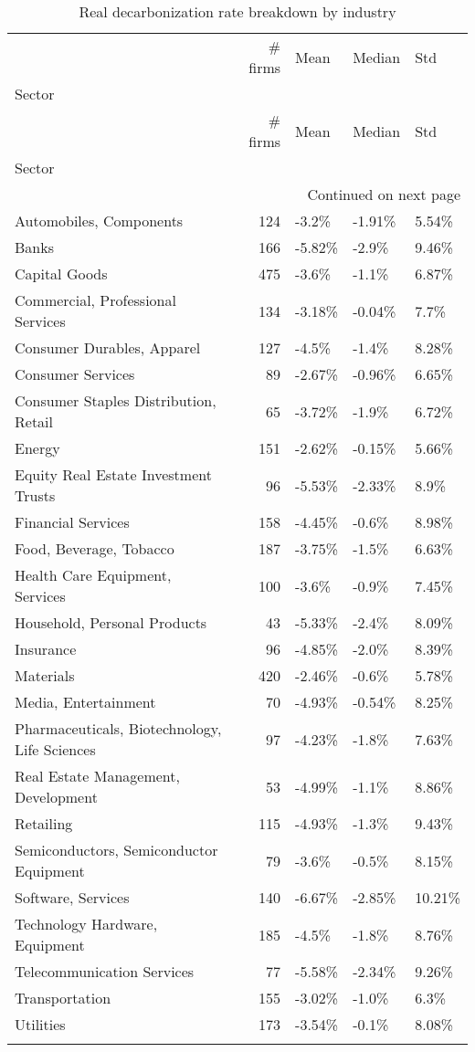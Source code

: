 \begin{longtable}{lrlll}
\toprule
 & \# firms & Mean & Median & Std \\
Sector &  &  &  &  \\
\midrule
\endfirsthead
\toprule
 & \# firms & Mean & Median & Std \\
Sector &  &  &  &  \\
\midrule
\endhead
\midrule
\multicolumn{5}{r}{Continued on next page} \\
\midrule
\endfoot
\bottomrule
\endlastfoot
Automobiles, Components & 124 & -3.2\% & -1.91\% & 5.54\% \\
Banks & 166 & -5.82\% & -2.9\% & 9.46\% \\
Capital Goods & 475 & -3.6\% & -1.1\% & 6.87\% \\
Commercial, Professional Services & 134 & -3.18\% & -0.04\% & 7.7\% \\
Consumer Durables, Apparel & 127 & -4.5\% & -1.4\% & 8.28\% \\
Consumer Services & 89 & -2.67\% & -0.96\% & 6.65\% \\
Consumer Staples Distribution, Retail & 65 & -3.72\% & -1.9\% & 6.72\% \\
Energy & 151 & -2.62\% & -0.15\% & 5.66\% \\
Equity Real Estate Investment Trusts & 96 & -5.53\% & -2.33\% & 8.9\% \\
Financial Services & 158 & -4.45\% & -0.6\% & 8.98\% \\
Food, Beverage, Tobacco & 187 & -3.75\% & -1.5\% & 6.63\% \\
Health Care Equipment, Services & 100 & -3.6\% & -0.9\% & 7.45\% \\
Household, Personal Products & 43 & -5.33\% & -2.4\% & 8.09\% \\
Insurance & 96 & -4.85\% & -2.0\% & 8.39\% \\
Materials & 420 & -2.46\% & -0.6\% & 5.78\% \\
Media, Entertainment & 70 & -4.93\% & -0.54\% & 8.25\% \\
Pharmaceuticals, Biotechnology, Life Sciences & 97 & -4.23\% & -1.8\% & 7.63\% \\
Real Estate Management, Development & 53 & -4.99\% & -1.1\% & 8.86\% \\
Retailing & 115 & -4.93\% & -1.3\% & 9.43\% \\
Semiconductors, Semiconductor Equipment & 79 & -3.6\% & -0.5\% & 8.15\% \\
Software, Services & 140 & -6.67\% & -2.85\% & 10.21\% \\
Technology Hardware, Equipment & 185 & -4.5\% & -1.8\% & 8.76\% \\
Telecommunication Services & 77 & -5.58\% & -2.34\% & 9.26\% \\
Transportation & 155 & -3.02\% & -1.0\% & 6.3\% \\
Utilities & 173 & -3.54\% & -0.1\% & 8.08\% \\
\caption{Real decarbonization rate breakdown by industry}
\label{tab:Industry-Real-Decarbonizaton-Breakdown}
\end{longtable}
